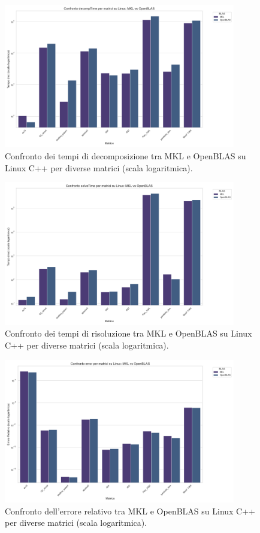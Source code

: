 \begin{figure}[H]
    \centering
    \includegraphics[width=0.9\textwidth]{images/C++/Linux/decompTime_comparison}
    \caption{Confronto dei tempi di decomposizione tra MKL e OpenBLAS su Linux C++ per diverse matrici (scala logaritmica).}
    \label{fig:linux-decomp-comparison}
\end{figure}

\begin{figure}[H]
    \centering
    \includegraphics[width=0.9\textwidth]{images/C++/Linux/solveTime_comparison}
    \caption{Confronto dei tempi di risoluzione tra MKL e OpenBLAS su Linux C++ per diverse matrici (scala logaritmica).}
    \label{fig:linux-solve-comparison}
\end{figure}

\begin{figure}[H]
    \centering
    \includegraphics[width=0.9\textwidth]{images/C++/Linux/error_comparison}
    \caption{Confronto dell'errore relativo tra MKL e OpenBLAS su Linux C++ per diverse matrici (scala logaritmica).}
    \label{fig:linux-error-comparison}
\end{figure}

